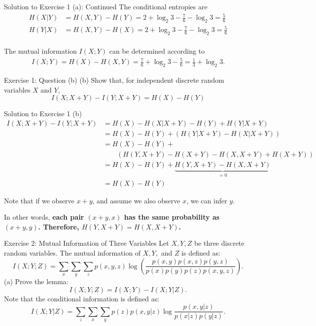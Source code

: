 \documentclass[aspectratio=169]{beamer}
\newcommand{\HX}{H(X)}
\newcommand{\HY}{H(Y)}
\newcommand{\HXY}{H(X, Y)}
\newcommand{\HXcY}{H(X | Y)}
\newcommand{\HYcX}{H(Y|X)}
\newcommand{\IXY}{I(X;Y)}
\begin{document}
\begin{frame}{Solution to Exercise 1 (a): Continued}
	The conditional entropies are
	\begin{align*}
		\HXcY &= \HXY - \HY = 2 + \log_2 3 - \frac{7}{6} - \log_2 3 = \frac{5}{6} \\
		\HYcX &= \HXY - \HX = 2 + \log_2 3 - \frac{7}{6} - \log_2 3 = \frac{5}{6} \\
	\end{align*}
	
	The mutual information $\IXY$ can be determined according to
	\begin{align*}
		\IXY = \HX - \HXY = \frac{7}{6} + \log_2 3 - \frac{5}{6} = \frac{1}{3} + \log_2 3.
	\end{align*}
\end{frame}


\begin{frame}{Exercise 1: Question (b)}
	(b) Show that, for independent discrete random variables $X$ and $Y$,
	$$I(X; X + Y) - I(Y; X + Y) = \HX - \HY$$
\end{frame}

\begin{frame}{Solution to Exercise 1 (b)}
\small
	\begin{align*}
		I(X; X+ Y) - I(Y; X+Y) 
		&= \HX - H(X | X + Y) - \HY + H(Y | X + Y) \\
		&= \HX - \HY  + (H(Y| X+Y) - H(X| X+Y)) \\
		&= \HX - \HY + \\
		&\qquad (H(Y, X+Y) - H(X+Y) - H(X, X+Y) + H(X+Y)) \\
		&= \HX - \HY + \underbrace{H(Y, X+Y) - H(X, X+Y)}_{=0} \\
		&= \HX - \HY
	\end{align*}

Note that if we observe $x+y$, and assume we also observe $x$, we can infer $y$.	 

In other words, \textbf{each pair $(x+y, x)$ has the same probability as $(x+y, y)$. Therefore, $H(Y, X+Y) = H(X, X+Y)$.}

\end{frame}

\begin{frame}{Exercise 2: Mutual Information of Three Variables}
	Let $X, Y, Z$ be three discrete random variables. The mutual information of $X, Y,$ and $Z$ is defined as:
	$$I(X; Y; Z) = \sum_x \sum_y \sum_z p(x, y, z) \log \left( \frac{p(x,y) p(x,z) p(y,z)}{p(x) p(y) p(z) p(x,y,z)}\right).$$
	(a) Prove the lemma:  $$I(X; Y; Z) = I(X; Y) - I(X; Y |Z).$$ Note that the conditional information is defined as: $$I(X; Y | Z) = \sum_z \sum_x \sum_y p(z) p(x, y |z) \log \frac{p(x, y | z)}{p(x|z) p(y|z)}.$$
\end{frame}
\end{document}
